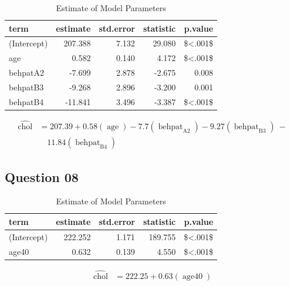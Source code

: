 \documentclass[
  12pt,
  oneside]{article}
\begin{document}
\begin{table}[H]

\caption{\label{tab:Table-09}Estimate of Model Parameters}
\centering
\begin{tabular}[t]{lrrrr}
\toprule
term & estimate & std.error & statistic & p.value\\
\midrule
(Intercept) & 207.388 & 7.132 & 29.080 & \$<.001\$\\
age & 0.582 & 0.140 & 4.172 & \$<.001\$\\
behpatA2 & -7.699 & 2.878 & -2.675 & 0.008\\
behpatB3 & -9.268 & 2.896 & -3.200 & 0.001\\
behpatB4 & -11.841 & 3.496 & -3.387 & \$<.001\$\\
\bottomrule
\end{tabular}
\end{table}

\begin{equation}
\begin{aligned}
\operatorname{\widehat{chol}} &= 207.39 + 0.58(\operatorname{age}) - 7.7(\operatorname{behpat}_{\operatorname{A2}}) - 9.27(\operatorname{behpat}_{\operatorname{B3}})\ - \\
&\quad 11.84(\operatorname{behpat}_{\operatorname{B4}})
\end{aligned}
\end{equation}

\hypertarget{question-08}{%
\subsection{Question 08}\label{question-08}}

\begin{table}[H]

\caption{\label{tab:Table-10}Estimate of Model Parameters}
\centering
\begin{tabular}[t]{lrrrr}
\toprule
term & estimate & std.error & statistic & p.value\\
\midrule
(Intercept) & 222.252 & 1.171 & 189.755 & \$<.001\$\\
age40 & 0.632 & 0.139 & 4.550 & \$<.001\$\\
\bottomrule
\end{tabular}
\end{table}

\begin{equation}
\begin{aligned}
\operatorname{\widehat{chol}} &= 222.25 + 0.63(\operatorname{age40})
\end{aligned}
\end{equation}
\end{document}
